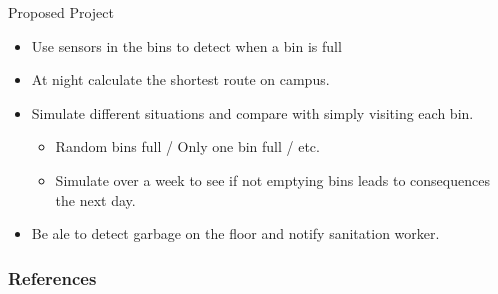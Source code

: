 \documentclass[18pt]{beamer}
\begin{document}
    \begin{frame}{Proposed Project}
        \begin{itemize}
            \item Use sensors in the bins to detect when a bin is full \pause
            \item At night calculate the shortest route on campus. \pause
            \item Simulate different situations and compare with simply visiting each bin. \pause
                \begin{itemize}
                     \item Random bins full / Only one bin full / etc.\pause
                     \item Simulate over a week to see if not emptying bins leads to consequences the next day. \pause
                \end{itemize}
            \item Be ale to detect garbage on the floor and notify sanitation worker.
        
        \end{itemize}
    \end{frame}
    
    \begin{frame}[allowframebreaks]
            \frametitle{References}
            
            
    \end{frame}
\end{document}
